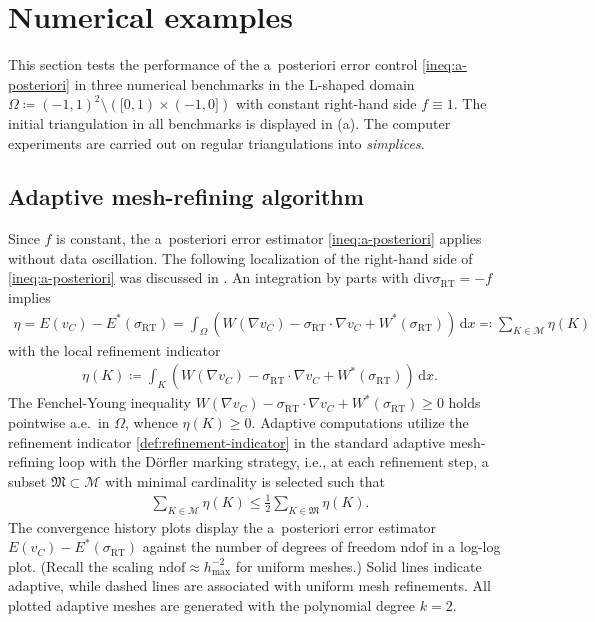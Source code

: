 \documentclass[a4paper]{amsart}
\numberwithin{equation}{section}
\renewcommand{\d}[1]{\,\mathrm{d}#1}
\renewcommand{\div}{\mathrm{div}}
\newcommand{\Mcal}{\mathcal{M}}
\newcommand{\RT}{\mathrm{RT}}
\theoremstyle{remark}
\begin{document}
\section{Numerical examples}\label{sec:numerical_examples}
This section tests the performance of the a~posteriori error 
control \eqref{ineq:a-posteriori} in three numerical benchmarks 
in the L-shaped domain $\Omega \coloneqq (-1,1)^2 \setminus ([0,1) \times (-1,0])$ with constant right-hand side $f \equiv 1$.
The initial triangulation in all benchmarks is displayed in 
(a).
The computer experiments are carried out on regular triangulations into \emph{simplices}.

\subsection{Adaptive mesh-refining algorithm}
Since $f$ is constant, the a~posteriori error estimator \eqref{ineq:a-posteriori} applies without data oscillation. The following localization of the right-hand side of \eqref{ineq:a-posteriori} was discussed in \cite{BartelsKaltenbach2023}.
An integration by parts with $\div \sigma_\RT = - f$ implies
\begin{align*}
	\eta = E(v_C) - E^*(\sigma_\RT) = \int_\Omega (W(\nabla v_C) - \sigma_\RT \cdot \nabla v_C + W^*(\sigma_\RT)) \d{x} \eqqcolon \sum_{K \in \Mcal} \eta(K)
\end{align*}
with the local refinement indicator
\begin{align}\label{def:refinement-indicator}
	\eta(K) \coloneqq \int_K (W(\nabla v_C) - \sigma_\RT \cdot \nabla v_C + W^*(\sigma_\RT)) \d{x}.
\end{align}
The Fenchel-Young inequality $W(\nabla v_C) - \sigma_\RT \cdot \nabla v_C + W^*(\sigma_\RT) \geq 0$ holds pointwise a.e.~in $\Omega$, whence $\eta(K) \geq 0$.
Adaptive computations utilize the refinement indicator \eqref{def:refinement-indicator} in the standard adaptive mesh-refining loop \cite{Doerfler1996,CarstensenFeischlPagePraetorius2014} with the D\"orfler marking strategy, i.e., at each refinement step, a subset $\mathfrak{M} \subset \mathcal{M}$ with minimal cardinality is selected such that
\begin{align*}
	\sum\nolimits_{K \in \mathcal{M}} \eta(K) \leq \frac{1}{2}\sum\nolimits_{K \in \mathfrak{M}} \eta(K).
\end{align*}
The convergence history plots display the a~posteriori error estimator $E(v_C) - E^*(\sigma_\RT)$ against the number of degrees of freedom $\mathrm{ndof}$ in a log-log plot.
(Recall the scaling $\mathrm{ndof} \approx h^{-2}_\mathrm{max}$ for uniform meshes.)
Solid lines indicate adaptive, while dashed lines are associated with uniform mesh refinements.
All plotted adaptive meshes are generated with the polynomial degree $k = 2$.
\end{document}
